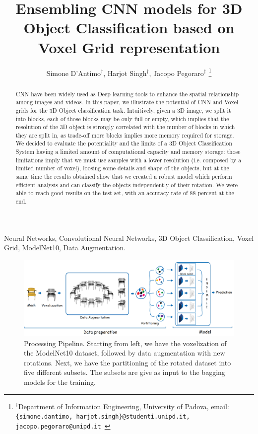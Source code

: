 \documentclass[10pt, conference, letterpaper]{IEEEtran}
\title{Ensembling CNN models for 3D Object Classification based on Voxel Grid representation}
\author{
    Simone D'Antimo$^\dag$, Harjot Singh$^\dag$, Jacopo Pegoraro$^\dag$
    \thanks{$^\dag$Department of Information Engineering, University of Padova,   \newline email: \texttt{\{simone.dantimo, harjot.singh\}@studenti.unipd.it,
    jacopo.pegoraro@unipd.it
    }}
}
\begin{document}
\maketitle
\begin{abstract}
\ac{CNN} have been widely used as Deep learning tools to enhance the spatial relationship among images and videos. In this paper, we illustrate the potential of CNN and Voxel grids for the 3D Object classification task. Intuitively, given a 3D image, we split it into blocks, each of those blocks may be only full or empty, which implies that the resolution of the 3D object is strongly correlated with the number of blocks in which they are split in, as trade-off more blocks implies more memory required for storage.
We decided to evaluate the potentiality and the limits of a 3D Object Classification System having a limited amount of computational capacity and memory storage: those limitations imply that we must use samples with a lower resolution (i.e. composed by a limited number of voxel), loosing some details and shape of the objects, but at the same time the results obtained show that we created a robust model which perform efficient analysis and can classify the objects independently of their rotation. We were able to reach good results on the test set, with an accuracy rate of 88 percent at the end.

\end{abstract}


\IEEEkeywords
Neural Networks, Convolutional Neural Networks, 3D Object Classification, Voxel Grid, ModelNet10, Data Augmentation.\endIEEEkeywords

\begin{figure}[h]
\begin{center}
        \centering
        \includegraphics[width=\textwidth]{resources/pipeline.png}
        \caption{Processing Pipeline. Starting from left, we have the voxelization of the ModelNet10 dataset, followed by data augmentation with new rotations. Next, we have the partitioning of the rotated dataset into five different subsets. The subsets are give as input to the bagging models for the training.}
        \label{fig:pipeline}
    \end{center}
\end{figure}
\end{document}
